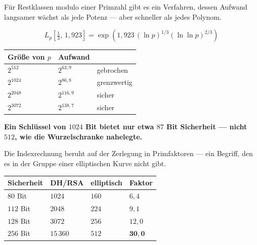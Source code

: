 \begin{warnung}
Für Restklassen modulo einer Primzahl gibt es ein Verfahren, dessen Aufwand langsamer wächst als jede Potenz --- aber schneller als jedes Polynom.

\[ L_p\!\left[\tfrac13,\,1{,}923\right] = \exp\left(1{,}923\,(\ln p)^{1/3}(\ln\ln p)^{2/3}\right) \]

\begin{center}
{\small
\renewcommand{\arraystretch}{1.48}
\begin{tabular}{@{}P{2.0cm}P{2.2cm}P{2.6cm}@{}}
\toprule
\textbf{Größe von $p$} & \textbf{Aufwand} & \\
\midrule
$2^{512}$ & $2^{63{,}9}$ & \textcolor{akzent}{gebrochen}\\
$2^{1024}$ & $2^{86{,}8}$ & \textcolor{mittel}{grenzwertig}\\
$2^{2048}$ & $2^{116{,}9}$ & sicher\\
$2^{3072}$ & $2^{138{,}7}$ & sicher\\
\bottomrule
\end{tabular}}
\end{center}

\begin{center}
\begin{minipage}{0.9\textwidth}
\textbf{Ein Schlüssel von $1024$ Bit bietet nur etwa $87$ Bit Sicherheit --- nicht $512$, wie die Wurzelschranke nahelegte.}
\end{minipage}
\end{center}

\begin{center}
\begin{minipage}{0.88\textwidth}
\end{minipage}
\end{center}

Die Indexrechnung beruht auf der Zerlegung in Primfaktoren --- ein Begriff, den es in der Gruppe einer elliptischen Kurve nicht gibt.

\begin{center}
{\small
\renewcommand{\arraystretch}{1.48}
\begin{tabular}{@{}P{2.2cm}P{2.2cm}P{2.2cm}P{1.8cm}@{}}
\toprule
\textbf{Sicherheit} & \textbf{DH/RSA} & \textbf{elliptisch} & \textbf{Faktor}\\
\midrule
$80$ Bit & $1024$ & $160$ & $6{,}4$\\
$112$ Bit & $2048$ & $224$ & $9{,}1$\\
$128$ Bit & $3072$ & $256$ & $12{,}0$\\
$256$ Bit & $15\,360$ & $512$ & $\mathbf{30{,}0}$\\
\bottomrule
\end{tabular}}
\end{center}


\end{warnung}
